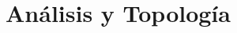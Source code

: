 \chapter{An\'alisis y Topolog\'ia}
\chaptertoc
\thispagestyle{empty}
\pagecolor{ptcbackground}
\author{%
\\
    Arturo Sanju\'an \\
    Universidad Distrital Francisco Jos\'e De Caldas \\
    \texttt{\footnotesize aasanjuanc@udistrital.edu.co}\vspace{40pt} \\
         }
\pagecolor{white}\afterpage{\nopagecolor}
\pagestyle{eimat}
\renewcommand\thesection{A\,$\&$T\ \nplpadding{2}\numprint{\arabic{section}}}
